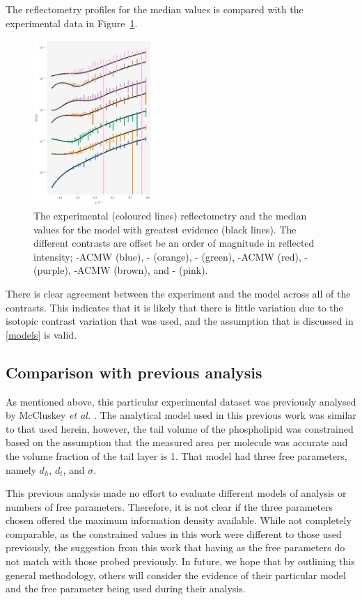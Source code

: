 \documentclass[
 reprint,
 superscriptaddress,
 amsmath,amssymb,
 aps,
]{revtex4-2}
\begin{document}
The reflectometry profiles for the median values is compared with the experimental data in Figure~\ref{fig:refl}. 
%
\begin{figure}
\includegraphics[width=0.4\textwidth]{refl}
\caption{\label{fig:refl} The experimental (coloured lines) reflectometry and the median values for the model with greatest evidence (black lines). The different contrasts are offset be an order of magnitude in reflected intensity; -ACMW (blue), - (orange), - (green), -ACMW (red), - (purple), -ACMW (brown), and - (pink).}
\end{figure}
%
There is clear agreement between the experiment and the model across all of the contrasts. 
This indicates that it is likely that there is little variation due to the isotopic contrast variation that was used, and the assumption that is discussed in \ref{models} is valid. 

\subsection{Comparison with previous analysis}

As mentioned above, this particular experimental dataset was previously analysed by McCluskey \emph{et al.} \cite{mccluskey_assessing_2019}.
The analytical model used in this previous work was similar to that used herein, however, the tail volume of the phospholipid was constrained based on the assumption that the measured area per molecule was accurate and the volume fraction of the tail layer is \num{1}. 
That model had three free parameters, namely $d_h$, $d_t$, and $\sigma$. 

This previous analysis made no effort to evaluate different models of analysis or numbers of free parameters. 
Therefore, it is not clear if the three parameters chosen offered the maximum information density available. 
While not completely comparable, as the constrained values in this work were different to those used previously, the suggestion from this work that having \unskip\;as the free parameters do not match with those probed previously.
In future, we hope that by outlining this general methodology, others will consider the evidence of their particular model and the free parameter being used during their analysis.
\end{document}
